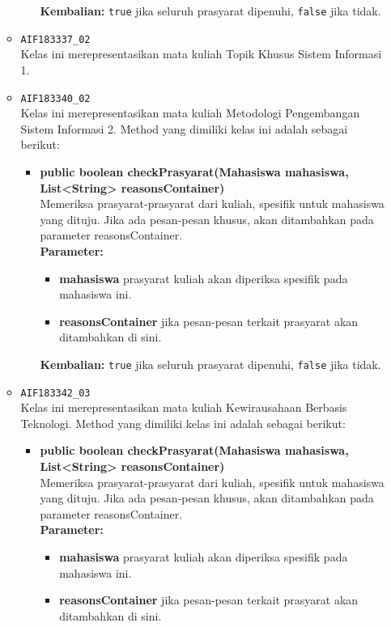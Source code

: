 \begin{enumerate}
\begin{itemize}
\begin{itemize}
\begin{itemize}
			\end{itemize}
			\textbf{Kembalian:} \texttt{true} jika seluruh prasyarat dipenuhi, \texttt{false} jika tidak.
		\end{itemize}
		\item \texttt{AIF183337\_02} \\
		Kelas ini merepresentasikan mata kuliah Topik Khusus Sistem Informasi 1.
		\item \texttt{AIF183340\_02} \\
		Kelas ini merepresentasikan mata kuliah Metodologi Pengembangan Sistem Informasi 2. Method yang dimiliki kelas ini adalah sebagai berikut: 
		\begin{itemize}
			\item \textbf{public boolean checkPrasyarat(Mahasiswa mahasiswa, List<String> reasonsContainer)}\\
			Memeriksa prasyarat-prasyarat dari kuliah, spesifik untuk mahasiswa yang dituju. Jika ada pesan-pesan khusus, akan ditambahkan pada parameter reasonsContainer.\\
			\textbf{Parameter:}
			\begin{itemize}
				\item \textbf{mahasiswa} prasyarat kuliah akan diperiksa spesifik pada mahasiswa ini.
				\item \textbf{reasonsContainer} jika pesan-pesan terkait prasyarat akan ditambahkan di sini.
			\end{itemize}
			\textbf{Kembalian:} \texttt{true} jika seluruh prasyarat dipenuhi, \texttt{false} jika tidak.
		\end{itemize}
		\item \texttt{AIF183342\_03} \\
		Kelas ini merepresentasikan mata kuliah Kewirausahaan Berbasis Teknologi. Method yang dimiliki kelas ini adalah sebagai berikut: 
		\begin{itemize}
			\item \textbf{public boolean checkPrasyarat(Mahasiswa mahasiswa, List<String> reasonsContainer)}\\
			Memeriksa prasyarat-prasyarat dari kuliah, spesifik untuk mahasiswa yang dituju. Jika ada pesan-pesan khusus, akan ditambahkan pada parameter reasonsContainer.\\
			\textbf{Parameter:}
			\begin{itemize}
				\item \textbf{mahasiswa} prasyarat kuliah akan diperiksa spesifik pada mahasiswa ini.
				\item \textbf{reasonsContainer} jika pesan-pesan terkait prasyarat akan ditambahkan di sini.

\end{itemize}
\end{itemize}
\end{itemize}
\end{enumerate}

